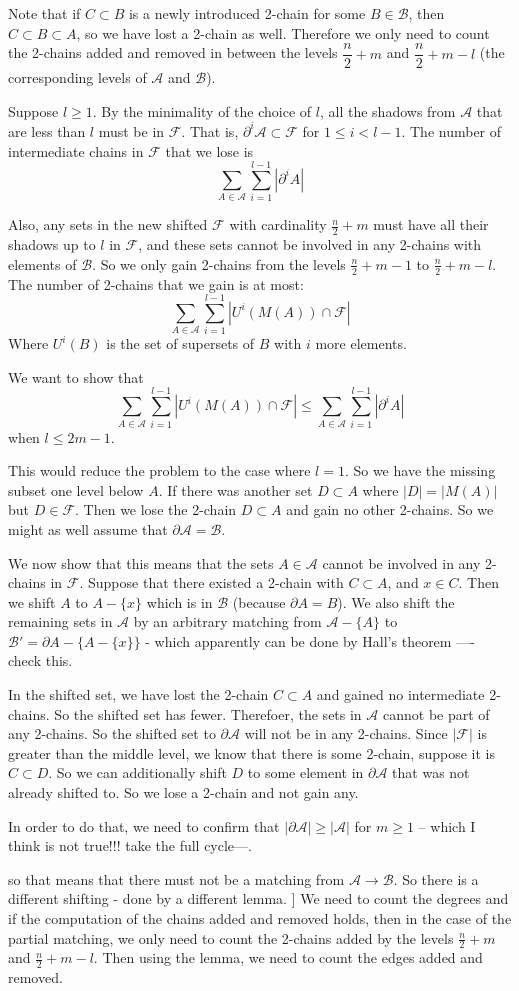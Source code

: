 \documentclass[11pt]{article}
\newcommand{\F}{\mathcal{F}}
\newcommand{\A}{\mathcal{A}}
\newcommand{\B}{\mathcal{B}}
\begin{document}
Note that if $C \subset B$ is a newly introduced 2-chain for some $B \in \B$, then $C \subset B \subset A$, so we have lost a 2-chain as well. Therefore we only need to count the 2-chains added and removed in between the levels $\dfrac{n}{2} + m$ and $\dfrac{n}{2} + m - l$ (the corresponding levels of $\A$ and $\B$). 

Suppose $l \geq 1$. By the minimality of the choice of $l$, all the shadows from $\A$ that are less than $l$ must be in $\F$. That is, $\partial^i\A \subset \F$ for $1 \leq i < l-1$. The number of intermediate chains in $\F$ that we lose is
\[ \sum_{A \in \A} \sum_{i=1}^{l-1} |\partial^i A| \]

Also, any sets in the new shifted $\F$ with cardinality $\frac{n}{2} + m$ must have all their shadows up to $l$ in $\F$, and these sets cannot be involved in any 2-chains with elements of $\B$. So we only gain 2-chains from the levels $\frac{n}{2}+m-1$ to $\frac{n}{2}+m-l$. The number of 2-chains that we gain is at most:
\[ \sum_{A \in \A} \sum_{i=1}^{l-1} |U^i(M(A)) \cap \F| \]
Where $U^i(B)$ is the set of supersets of $B$ with $i$ more elements.

We want to show that \[ \sum_{A \in \A} \sum_{i=1}^{l-1} |U^i(M(A)) \cap \F| \leq  \sum_{A \in \A} \sum_{i=1}^{l-1} |\partial^i A| \] when $l \leq 2m-1$.

This would reduce the problem to the case where $l=1$. So we have the missing subset one level below $A$. If there was another set $D \subset A$ where $|D| = |M(A)|$ but $D \in \F$. Then we lose the 2-chain $D \subset A$ and gain no other 2-chains. So we might as well assume that $\partial \A = \B$. 

We now show that this means that the sets $A \in \A$ cannot be involved in any 2-chains in $\F$. Suppose that there existed a 2-chain with $C \subset A$, and $x \in C$. Then we shift $A$ to $A - \{ x \}$ which is in $\B$ (because $\partial A = B$). We also shift the remaining sets in $\A$ by an arbitrary matching from $\A - \{ A \}$ to $\B' = \partial A - \{ A - \{x\} \}$ - which apparently can be done by Hall's theorem ---- check this. 

In the shifted set, we have lost the 2-chain $C \subset A$ and gained no intermediate 2-chains. So the shifted set has fewer. Therefoer, the sets in $\A$ cannot be part of any 2-chains. So the shifted set to $\partial \A$ will not be in any 2-chains. Since $|\F|$ is greater than the middle level, we know that there is some 2-chain, suppose it is $C \subset D$. So we can additionally shift $D$ to some element in $\partial \A$ that was not already shifted to. So we lose a 2-chain and not gain any. 

In order to do that, we need to confirm that $|\partial \A| \geq |\A|$ for $m\geq 1$ -- which I think is not true!!! take the full cycle---. 

so that means that there must not be a matching from $\A \rightarrow \B$. So there is a different shifting - done by a different lemma. ]
We need to count the degrees and if the computation of the chains added and removed holds, then in the case of the partial matching, we only need to count the 2-chains added by the levels $\frac{n}{2}+m$ and $\frac{n}{2} + m - l$. Then using the lemma, we need to count the edges added and removed. 
\end{document}
